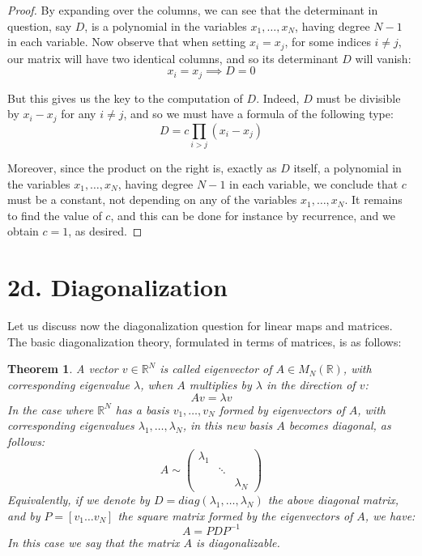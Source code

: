 \documentclass[12pt]{amsbook}
\newtheorem{theorem}{Theorem}[chapter]
\begin{document}
\begin{proof}
By expanding over the columns, we can see that the determinant in question, say $D$, is a polynomial in the variables $x_1,\ldots,x_N$, having degree $N-1$ in each variable. Now observe that when setting $x_i=x_j$, for some indices $i\neq j$, our matrix will have two identical columns, and so its determinant $D$ will vanish:
$$x_i=x_j\implies D=0$$

But this gives us the key to the computation of $D$. Indeed, $D$ must be divisible by $x_i-x_j$ for any $i\neq j$, and so we must have a formula of the following type:
$$D=c\prod_{i>j}(x_i-x_j)$$

Moreover, since the product on the right is, exactly as $D$ itself, a polynomial in the variables $x_1,\ldots,x_N$, having degree $N-1$ in each variable, we conclude that $c$ must be a constant, not depending on any of the variables $x_1,\ldots,x_N$. It remains to find the value of $c$, and this can be done for instance by recurrence, and we obtain $c=1$, as desired.
\end{proof}

\section*{2d. Diagonalization} 

Let us discuss now the diagonalization question for linear maps and matrices. The basic diagonalization theory, formulated in terms of matrices, is as follows:


\begin{theorem}
A vector $v\in\mathbb R^N$ is called eigenvector of $A\in M_N(\mathbb R)$, with corresponding eigenvalue $\lambda$, when $A$ multiplies by $\lambda$ in the direction of $v$:
$$Av=\lambda v$$
In the case where $\mathbb R^N$ has a basis $v_1,\ldots,v_N$ formed by eigenvectors of $A$, with corresponding eigenvalues $\lambda_1,\ldots,\lambda_N$, in this new basis $A$ becomes diagonal, as follows:
$$A\sim\begin{pmatrix}\lambda_1\\&\ddots\\&&\lambda_N\end{pmatrix}$$
Equivalently, if we denote by $D=diag(\lambda_1,\ldots,\lambda_N)$ the above diagonal matrix, and by $P=[v_1\ldots v_N]$ the square matrix formed by the eigenvectors of $A$, we have:
$$A=PDP^{-1}$$
In this case we say that the matrix $A$ is diagonalizable.
\end{theorem}
\end{document}
